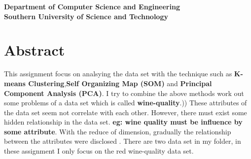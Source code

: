 \documentclass[titlepage,a4paper,12pt,thmsb]{report}
\begin{document}
\begin{titlepage}
\begin{center}
\begin{figure}[h]
{\par}
\end{figure}
\large{\bf Department of Computer Science and Engineering} \\
\vskip 0.5cm
\Large{\bf Southern University of Science and Technology}\\
{\centering {}}
\end{center}
\pagebreak
\end{titlepage}


\chapter*{Abstract}
This assignment focus on analsying the data set with the technique such as {\bf K-means Clustering},{\bf Self Organizing Map (SOM)} and {\bf Principal Component Analysis (PCA)}. I try to combine the above methods work out some problems of a data set which is called {\bf wine-quality}.))
These attributes of the data set seem not correlate with each other. However, there must exist some hidden relationship in the data set. {\bf eg: wine quality must be influence by some attribute}. With the reduce of dimension, gradually the relationship between the attributes were disclosed .  There are two data set in my folder, in these assignment I only focus on the red wine-quality data set.
\end{document}
